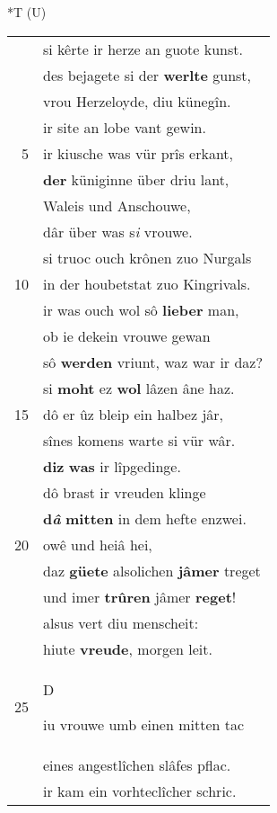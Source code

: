 \documentclass[8pt,a4paper,notitlepage]{article}
\begin{document}
\begin{table}[ht]
\begin{minipage}[t]{0.5\linewidth}
\end{minipage}
\hspace{0.5cm}
\begin{minipage}[t]{0.5\linewidth}
\small
\begin{center}*T (U)
\end{center}
\begin{tabular}{rl}
 & si kêrte ir herze an guote kunst.\\ 
 & des bejagete si der \textbf{werlte} gunst,\\ 
 & vrou Herzeloyde, diu künegîn.\\ 
 & ir site an lobe vant gewin.\\ 
5 & ir kiusche was vür prîs erkant,\\ 
 & \textbf{der} küniginne über driu lant,\\ 
 & Waleis und Anschouwe,\\ 
 & dâr über was s\textit{i} vrouwe.\\ 
 & si truoc ouch krônen zuo Nurgals\\ 
10 & in der houbetstat zuo Kingrivals.\\ 
 & ir was ouch wol sô \textbf{lieber} man,\\ 
 & ob ie dekein vrouwe gewan\\ 
 & sô \textbf{werden} vriunt, waz war ir daz?\\ 
 & si \textbf{moht} ez \textbf{wol} lâzen âne haz.\\ 
15 & dô er ûz bleip ein halbez jâr,\\ 
 & sînes komens warte si vür wâr.\\ 
 & \textbf{diz} \textbf{was} ir lîpgedinge.\\ 
 & dô brast ir vreuden klinge\\ 
 & \textbf{d\textit{â}} \textbf{mitten} in dem hefte enzwei.\\ 
20 & owê und heiâ hei,\\ 
 & daz \textbf{güete} alsolichen \textbf{jâmer} treget\\ 
 & und imer \textbf{trûren} jâmer \textbf{reget}!\\ 
 & alsus vert diu menscheit:\\ 
 & hiute \textbf{vreude}, morgen leit.\\ 
25 & \begin{large}D\end{large}iu vrouwe umb einen mitten tac\\ 
 & eines angestlîchen slâfes pflac.\\ 
 & ir kam ein vorhteclîcher schric.\\ 

\end{tabular}
\end{minipage}
\end{table}
\end{document}
